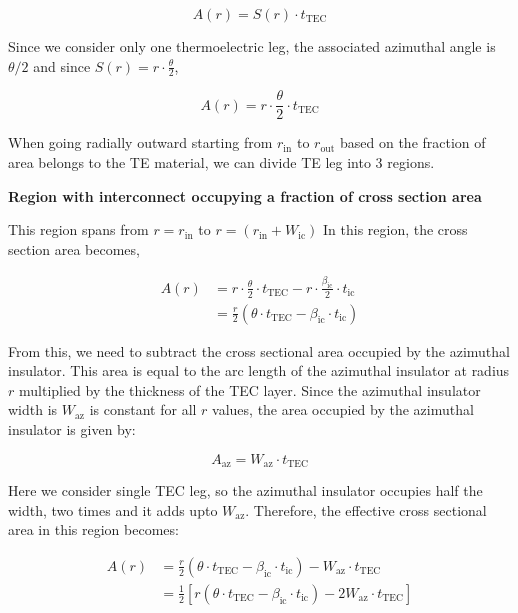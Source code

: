\documentclass[10pt,a4paper,twocolumn]{article}
\begin{document}
\begin{equation}
  A(r) = S(r) \cdot t_{\text{TEC}}
  \label{eq:annular_segment_radial_area}
\end{equation}

Since we consider only one thermoelectric leg, the associated azimuthal angle is $\theta/2$ and since $S(r) = r \cdot \frac{\theta}{2}$,

\begin{equation}
  A(r) = r \cdot \frac{\theta}{2} \cdot t_{\text{TEC}}
  \label{eq:cross_section_area_radial_dir}
\end{equation}

When going radially outward starting from $r_{\text{in}}$ to $r_{\text{out}}$ based on the fraction of area belongs to the TE material, we can divide TE leg into 3 regions.

\textbf{Region with interconnect occupying a fraction of cross section area}

This region spans from $r=r_{\text{in}}$ to $r=(r_{\text{in}}+W_{\text{ic}})$ In this region, the cross section area becomes,

\begin{equation}
  \begin{aligned}
    A(r) & = r\cdot \frac{\theta}{2} \cdot t_{\text{TEC}} - r \cdot \frac{\beta_{\text{ic}}}{2} \cdot t_{\text{ic}} \\
         & = \frac{r}{2} (\theta \cdot t_{\text{TEC}} - \beta_{\text{ic}} \cdot t_{\text{ic}} )
  \end{aligned}
\end{equation}

From this, we need to subtract the cross sectional area occupied by the azimuthal insulator. This area is equal to the arc length of the azimuthal insulator at radius $r$ multiplied by the thickness of the TEC layer. Since the azimuthal insulator width is $W_{\text{az}}$ is constant for all $r$ values, the area occupied by the azimuthal insulator is given by:

\begin{equation}
  A_{\text{az}} = W_{\text{az}} \cdot t_{\text{TEC}}
\end{equation}

Here we consider single TEC leg, so the azimuthal insulator occupies half the width, two times and it adds upto $W_{\text{az}}$. Therefore, the effective cross sectional area in this region becomes:

\begin{equation*}
  \begin{aligned}
    A(r) & = \frac{r}{2} (\theta \cdot t_{\text{TEC}} - \beta_{\text{ic}} \cdot t_{\text{ic}} ) - W_{\text{az}} \cdot t_{\text{TEC}}                    \\
         & = \frac{1}{2} \left[ r (\theta \cdot t_{\text{TEC}} - \beta_{\text{ic}} \cdot t_{\text{ic}} ) - 2 W_{\text{az}} \cdot t_{\text{TEC}} \right]
  \end{aligned}
\end{equation*}
\end{document}
